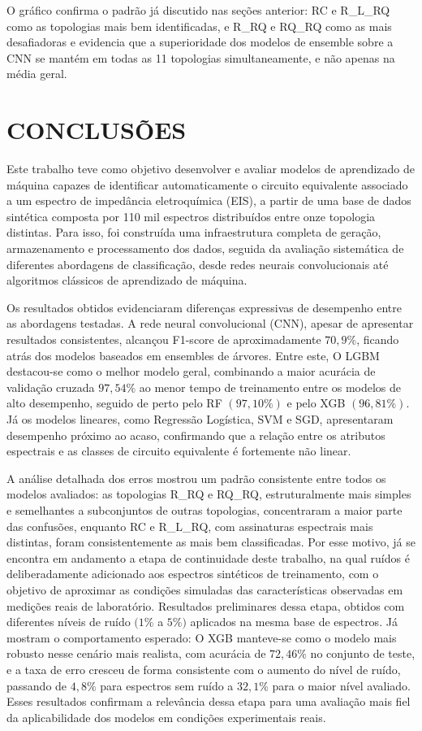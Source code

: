 {O gráfico confirma o padrão já discutido nas seções anterior: RC e R\_L\_RQ
como as topologias mais bem identificadas, e R\_RQ e RQ\_RQ como as mais desafiadoras e
evidencia que a superioridade dos modelos de ensemble sobre a CNN se mantém em todas as
11 topologias simultaneamente, e não apenas na média geral.

\chapter{CONCLUSÕES}
Este trabalho teve como objetivo desenvolver e avaliar modelos de aprendizado de
máquina capazes de identificar automaticamente o circuito equivalente associado a um espectro
de impedância eletroquímica (EIS), a partir de uma base de dados sintética composta por 110
mil espectros distribuídos entre onze topologia distintas. Para isso, foi construída uma
infraestrutura completa de geração, armazenamento e processamento dos dados, seguida da
avaliação sistemática de diferentes abordagens de classificação, desde redes neurais
convolucionais até algoritmos clássicos de aprendizado de máquina.

Os resultados obtidos evidenciaram diferenças expressivas de desempenho entre as
abordagens testadas. A rede neural convolucional (CNN), apesar de apresentar resultados
consistentes, alcançou F1-score de aproximadamente $70,9\%$, ficando atrás dos modelos
baseados em ensembles de árvores. Entre este, O LGBM destacou-se como o melhor modelo
geral, combinando a maior acurácia de validação cruzada $97,54\%$ ao menor tempo de
treinamento entre os modelos de alto desempenho, seguido de perto pelo RF $(97,10\%)$ e pelo
XGB $(96,81\%)$. Já os modelos lineares, como Regressão Logística, SVM e SGD, apresentaram
desempenho próximo ao acaso, confirmando que a relação entre os atributos espectrais e as
classes de circuito equivalente é fortemente não linear.

A análise detalhada dos erros mostrou um padrão consistente entre todos os
modelos avaliados: as topologias R\_RQ e RQ\_RQ, estruturalmente mais simples e semelhantes
a subconjuntos de outras topologias, concentraram a maior parte das confusões, enquanto RC e
R\_L\_RQ, com assinaturas espectrais mais distintas, foram consistentemente as mais bem
classificadas. Por esse motivo, já se encontra em andamento a etapa de continuidade deste
trabalho, na qual ruídos é deliberadamente adicionado aos espectros sintéticos de treinamento,
com o objetivo de aproximar as condições simuladas das características observadas em
medições reais de laboratório. Resultados preliminares dessa etapa, obtidos com diferentes
níveis de ruído $(1\%$ a $5\%)$ aplicados na mesma base de espectros. Já mostram o comportamento
esperado: O XGB manteve-se como o modelo mais robusto nesse cenário mais realista, com
acurácia de $72,46\%$ no conjunto de teste, e a taxa de erro cresceu de forma consistente com o
aumento do nível de ruído, passando de $4,8\%$ para espectros sem ruído a $32,1\%$ para o maior
nível avaliado. Esses resultados confirmam a relevância dessa etapa para uma avaliação mais
fiel da aplicabilidade dos modelos em condições experimentais reais.

}
